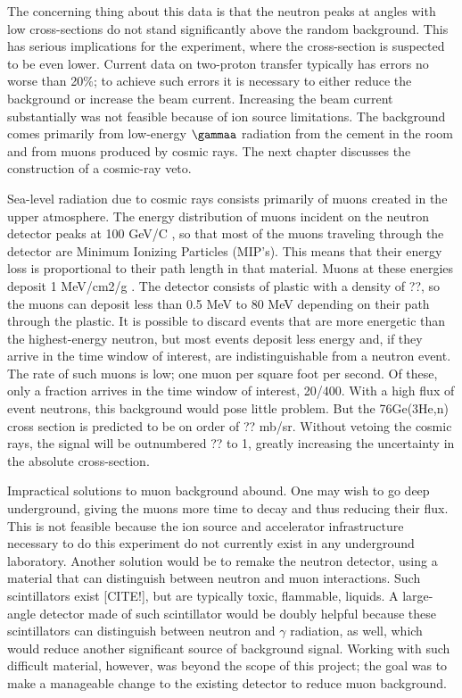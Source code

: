 

The concerning thing about this data is that the neutron peaks at angles with low cross-sections do not stand significantly above the random background.  This has serious implications for the \GeTargets experiment, where the cross-section is suspected to be even lower.  Current data on two-proton transfer typically has errors no worse than 20\%; to achieve such errors it is necessary to either reduce the background or increase the beam current.  Increasing the beam current substantially was not feasible because of ion source limitations.  The background comes primarily from low-energy $\gammaa$ radiation from the cement in the room and from muons produced by cosmic rays.  The next chapter discusses the construction of a cosmic-ray veto.

Sea-level radiation due to cosmic rays consists primarily of muons created in the upper atmosphere.  The energy distribution of muons incident on the neutron detector peaks at 100 GeV/C \cite{PDG}, so that most of the muons traveling through the detector are Minimum Ionizing Particles (MIP's).  This means that their energy loss is proportional to their path length in that material.  Muons at these energies deposit 1 MeV/cm2/g \cite{PDG}.  The detector consists of plastic with a density of ??, so the muons can deposit less than 0.5 MeV to 80 MeV depending on their path through the plastic.  It is possible to discard events that are more energetic than the highest-energy neutron, but most events deposit less energy and, if they arrive in the time window of interest, are indistinguishable from a neutron event.  The rate of such muons is low; one muon per square foot per second.  Of these, only a fraction arrives in the time window of interest, 20/400.  With a high flux of event neutrons, this background would pose little problem.  But the 76Ge(3He,n) cross section is predicted to be on order of ?? mb/sr.  Without vetoing the cosmic rays, the signal will be outnumbered ?? to 1, greatly increasing the uncertainty in the absolute cross-section. 

Impractical solutions to muon background abound.  One may wish to go deep underground, giving the muons more time to decay and thus reducing their flux.  This is not feasible because the ion source and accelerator infrastructure necessary to do this experiment do not currently exist in any underground laboratory.  Another solution would be to remake the neutron detector, using a material that can distinguish between neutron and muon interactions.  Such scintillators exist [CITE!], but are typically toxic, flammable, liquids.  A large-angle detector made of such scintillator would be doubly helpful because these scintillators can distinguish between neutron and $\gamma$ radiation, as well, which would reduce another significant source of background signal.  Working with such difficult material, however, was beyond the scope of this project; the goal was to make a manageable change to the existing detector to reduce muon background. 


